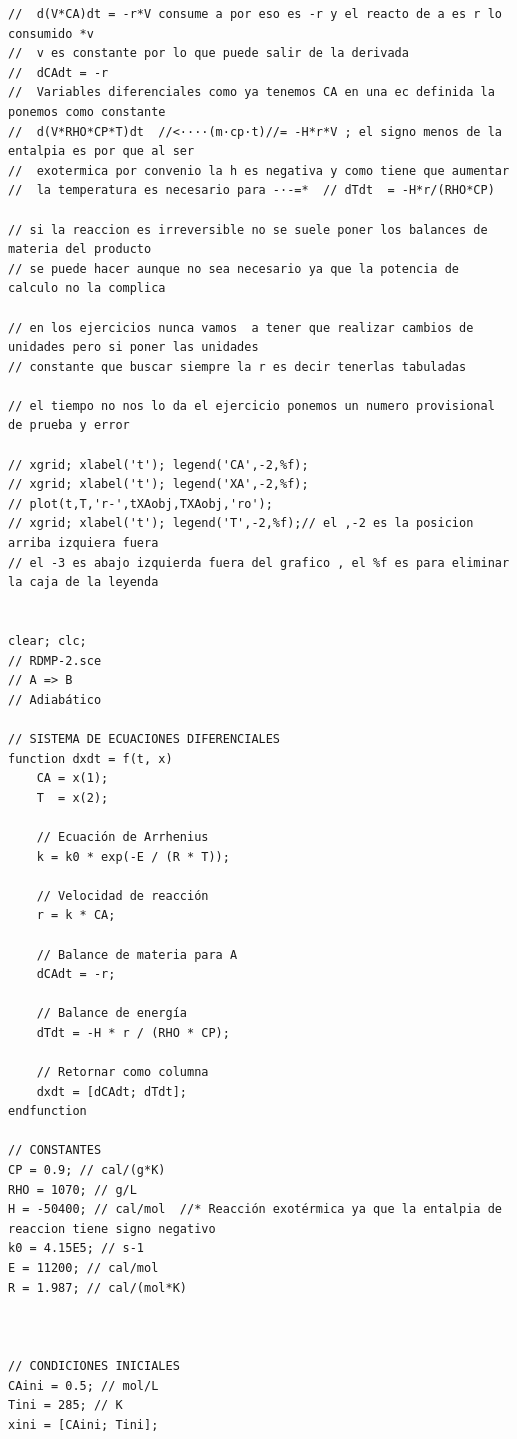 \documentclass{report}
\begin{document}
\newpage
\solve{}
\begin{verbatim}
//  d(V*CA)dt = -r*V consume a por eso es -r y el reacto de a es r lo consumido *v
//  v es constante por lo que puede salir de la derivada
//  dCAdt = -r  
//  Variables diferenciales como ya tenemos CA en una ec definida la ponemos como constante 
//  d(V*RHO*CP*T)dt  //<····(m·cp·t)//= -H*r*V ; el signo menos de la entalpia es por que al ser 
//  exotermica por convenio la h es negativa y como tiene que aumentar 
//  la temperatura es necesario para -·-=*  // dTdt  = -H*r/(RHO*CP)   

// si la reaccion es irreversible no se suele poner los balances de materia del producto 
// se puede hacer aunque no sea necesario ya que la potencia de calculo no la complica

// en los ejercicios nunca vamos  a tener que realizar cambios de unidades pero si poner las unidades
// constante que buscar siempre la r es decir tenerlas tabuladas

// el tiempo no nos lo da el ejercicio ponemos un numero provisional de prueba y error

// xgrid; xlabel('t'); legend('CA',-2,%f);
// xgrid; xlabel('t'); legend('XA',-2,%f);
// plot(t,T,'r-',tXAobj,TXAobj,'ro');
// xgrid; xlabel('t'); legend('T',-2,%f);// el ,-2 es la posicion arriba izquiera fuera
// el -3 es abajo izquierda fuera del grafico , el %f es para eliminar la caja de la leyenda


clear; clc;
// RDMP-2.sce
// A => B
// Adiabático

// SISTEMA DE ECUACIONES DIFERENCIALES
function dxdt = f(t, x)
    CA = x(1);
    T  = x(2);
    
    // Ecuación de Arrhenius
    k = k0 * exp(-E / (R * T));
    
    // Velocidad de reacción
    r = k * CA;
    
    // Balance de materia para A
    dCAdt = -r;
    
    // Balance de energía
    dTdt = -H * r / (RHO * CP);
    
    // Retornar como columna
    dxdt = [dCAdt; dTdt]; 
endfunction

// CONSTANTES
CP = 0.9; // cal/(g*K)
RHO = 1070; // g/L
H = -50400; // cal/mol  //* Reacción exotérmica ya que la entalpia de reaccion tiene signo negativo
k0 = 4.15E5; // s-1
E = 11200; // cal/mol
R = 1.987; // cal/(mol*K)



// CONDICIONES INICIALES
CAini = 0.5; // mol/L
Tini = 285; // K
xini = [CAini; Tini];


\end{verbatim}
\end{document}
